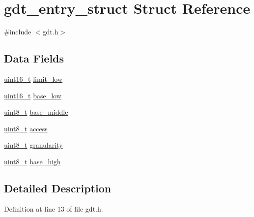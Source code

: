 \hypertarget{a00142}{}\section{gdt\+\_\+entry\+\_\+struct Struct Reference}
\label{a00142}


{\ttfamily \#include $<$gdt.\+h$>$}

\subsection*{Data Fields}
\begin{DoxyCompactItemize}
\item 
\hyperlink{a00092_a273cf69d639a59973b6019625df33e30_a273cf69d639a59973b6019625df33e30}{uint16\+\_\+t} \hyperlink{a00142_a6bbf5ad7af7b8e8e7f7c26ec74d8c1b2_a6bbf5ad7af7b8e8e7f7c26ec74d8c1b2}{limit\+\_\+low}
\item 
\hyperlink{a00092_a273cf69d639a59973b6019625df33e30_a273cf69d639a59973b6019625df33e30}{uint16\+\_\+t} \hyperlink{a00142_adba88eafea5f07167d181e4090cbcf49_adba88eafea5f07167d181e4090cbcf49}{base\+\_\+low}
\item 
\hyperlink{a00092_aba7bc1797add20fe3efdf37ced1182c5_aba7bc1797add20fe3efdf37ced1182c5}{uint8\+\_\+t} \hyperlink{a00142_a986d46963d3ccdbec85b3749c1e09abf_a986d46963d3ccdbec85b3749c1e09abf}{base\+\_\+middle}
\item 
\hyperlink{a00092_aba7bc1797add20fe3efdf37ced1182c5_aba7bc1797add20fe3efdf37ced1182c5}{uint8\+\_\+t} \hyperlink{a00142_ac07173385496c5b952e58ddc20f1cc99_ac07173385496c5b952e58ddc20f1cc99}{access}
\item 
\hyperlink{a00092_aba7bc1797add20fe3efdf37ced1182c5_aba7bc1797add20fe3efdf37ced1182c5}{uint8\+\_\+t} \hyperlink{a00142_a7fb7b3704e10434dbe64564416cf1a25_a7fb7b3704e10434dbe64564416cf1a25}{granularity}
\item 
\hyperlink{a00092_aba7bc1797add20fe3efdf37ced1182c5_aba7bc1797add20fe3efdf37ced1182c5}{uint8\+\_\+t} \hyperlink{a00142_aa08eedea9c0f707b9fa052b7567879c7_aa08eedea9c0f707b9fa052b7567879c7}{base\+\_\+high}
\end{DoxyCompactItemize}


\subsection{Detailed Description}


Definition at line 13 of file gdt.\+h.



